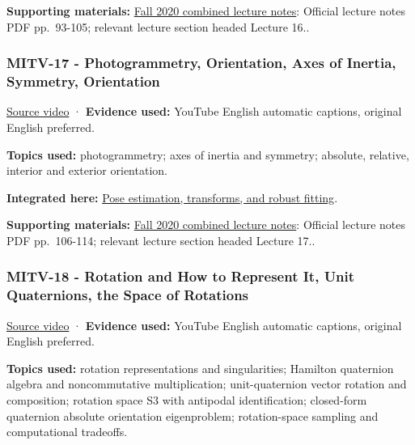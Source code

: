 \textbf{Supporting materials:} \href{https://ocw.mit.edu/courses/6-801-machine-vision-fall-2020/9ec44f69e72995c370b3797818ba01e6_MIT6_801F20_lectureNotes.pdf}{Fall 2020 combined lecture notes}: Official lecture notes PDF pp.~93-105; relevant lecture section headed Lecture 16..

\subsubsection{MITV-17 - Photogrammetry, Orientation, Axes of Inertia, Symmetry, Orientation}\label{04-visual-computing-ii-ch036-mitv-17---photogrammetry-orientation-axes-of-inertia-symmetry-orientation}

\href{https://www.youtube.com/watch?v=R8O0vlHBeNc}{Source video} · \textbf{Evidence used:} YouTube English automatic captions, original English preferred.

\textbf{Topics used:} photogrammetry; axes of inertia and symmetry; absolute, relative, interior and exterior orientation.

\textbf{Integrated here:} \hyperref[04-visual-computing-ii-ch032-pose-estimation-transforms-and-robust-fitting]{Pose estimation, transforms, and robust fitting}.

\textbf{Supporting materials:} \href{https://ocw.mit.edu/courses/6-801-machine-vision-fall-2020/9ec44f69e72995c370b3797818ba01e6_MIT6_801F20_lectureNotes.pdf}{Fall 2020 combined lecture notes}: Official lecture notes PDF pp.~106-114; relevant lecture section headed Lecture 17..

\subsubsection{MITV-18 - Rotation and How to Represent It, Unit Quaternions, the Space of Rotations}\label{04-visual-computing-ii-ch036-mitv-18---rotation-and-how-to-represent-it-unit-quaternions-the-space-of-rotations}

\href{https://www.youtube.com/watch?v=uiG6KY0Cqd8}{Source video} · \textbf{Evidence used:} YouTube English automatic captions, original English preferred.

\textbf{Topics used:} rotation representations and singularities; Hamilton quaternion algebra and noncommutative multiplication; unit-quaternion vector rotation and composition; rotation space S3 with antipodal identification; closed-form quaternion absolute orientation eigenproblem; rotation-space sampling and computational tradeoffs.


